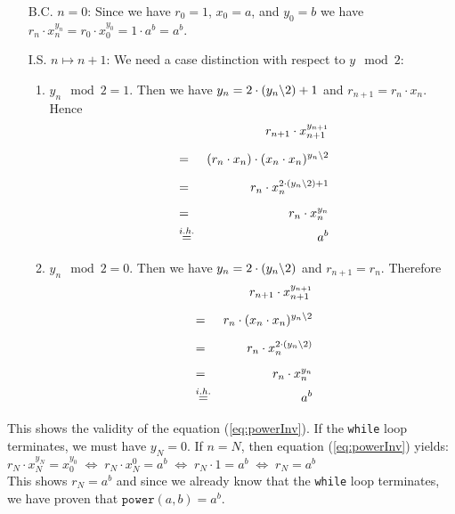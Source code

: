 \begin{enumerate}
\item[B.C.] $n=0$: Since we have $r_0 = 1$, $x_0 = a$, and $y_0 = b$ we have 
            \\[0.2cm]
            \hspace*{1.3cm}
            $r_n \cdot x_n^{y_n} = r_0 \cdot x_0^{y_0} = 1 \cdot a^{b} = a^b$.
\item[I.S.] $n \mapsto n + 1$:  We need a case distinction with respect to $y \mod 2$:
            \begin{enumerate}
            \item $y_n \mod 2 = 1$.  Then we have $y_{n} = 2 \cdot (y_n\symbol{92}2) + 1$ and
                  $r_{n+1} = r_n \cdot x_n$.  Hence
                  \begin{eqnarray*}
                      &   & r_{n+1} \cdot x_{n+1}^{y_{n+1}} \\[0.2cm] 
                      & = & (r_{n} \cdot x_n) \cdot (x_{n} \cdot x_{n})^{y_{n}\symbol{92}2} \\[0.2cm] 
                      & = & r_{n} \cdot x_n^{2 \cdot (y_{n}\symbol{92}2) + 1} \\[0.2cm] 
                      & = & r_{n} \cdot x_n^{y_n} \\
                      & \stackrel{i.h.}{=} & a^{b} 
                  \end{eqnarray*}
\pagebreak

            \item $y_n \mod 2 = 0$.  Then we have $y_{n} = 2 \cdot (y_n\symbol{92}2)$ and $r_{n+1} = r_n$.
                  Therefore
                  \begin{eqnarray*}
                      &   & r_{n+1} \cdot x_{n+1}^{y_{n+1}} \\[0.2cm] 
                      & = & r_{n} \cdot (x_{n} \cdot x_{n})^{y_{n}\symbol{92}2} \\[0.2cm] 
                      & = & r_{n} \cdot x_n^{2 \cdot (y_{n} \symbol{92} 2)} \\[0.2cm] 
                      & = & r_{n} \cdot x_n^{y_n} \\
                      & \stackrel{i.h.}{=} & a^{b} 
                  \end{eqnarray*}
            \end{enumerate}
\end{enumerate}
This shows the validity of the equation (\ref{eq:powerInv}).   If the \texttt{while} loop
terminates, we must have $y_N = 0$.  If $n=N$, then equation (\ref{eq:powerInv}) yields:
\\[0.2cm]
\hspace*{1.3cm}
$r_N \cdot x_N^{y_N} = x_0^{y_0} 
 \;\Longleftrightarrow\; r_N \cdot x_N^{0}   = a^b
 \;\Longleftrightarrow\;  r_N \cdot 1         = a^b
 \;\Longleftrightarrow\;  r_N                 = a^b
$
\\[0.2cm]
This shows $r_N = a^b$ and since we already know that the
\texttt{while} loop terminates, we have proven that
$\texttt{power}(a,b) =a^b$.

